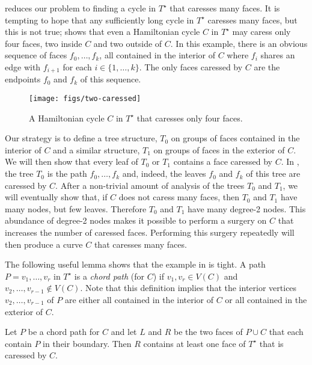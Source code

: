 \documentclass[a4paper,UKenglish]{socg-lipics-v2019}
\newcommand{\dual}[1]{{#1}^\star}
\begin{document}
 reduces our problem to finding a cycle in
$\dual{T}$ that caresses many faces.  It is tempting to hope that
any sufficiently long cycle in $\dual{T}$ caresses many faces, but
this is not true;  shows that even a Hamiltonian
cycle $C$ in $\dual{T}$ may caress only four faces, two inside $C$ and
two outside of $C$.  In this example, there is an obvious sequence of
faces $f_0,\ldots,f_k$, all contained in the interior of $C$ where $f_i$
shares an edge with $f_{i+1}$ for each $i\in\{1,\ldots,k\}$.  The only
faces caressed by $C$ are the endpoints $f_0$ and $f_k$ of this sequence.

\begin{figure}
   \begin{center}
       \texttt{[image: figs/two-caressed]}
   \end{center}
   \caption{A Hamiltonian cycle $C$ in $\dual{T}$ that caresses only four faces.}
\end{figure}

Our strategy is to define a tree structure, $T_0$ on groups of faces
contained in the interior of $C$ and a similar structure, $T_1$ on groups
of faces in the exterior of $C$.  We will then show that every leaf of
$T_0$ or $T_1$ contains a face caressed by $C$. In ,
the tree $T_0$ is the path $f_0,\ldots,f_k$ and, indeed, the leaves $f_0$
and $f_k$ of this tree are caressed by $C$.  After a non-trivial amount
of analysis of the trees $T_0$ and $T_1$, we will eventually show that,
if $C$ does not caress many faces, then $T_0$ and $T_1$ have many nodes,
but few leaves.  Therefore $T_0$ and $T_1$ have many degree-2 nodes.
This abundance of degree-2 nodes makes it possible to perform a surgery
on $C$ that increases the number of caressed faces.  Performing this
surgery repeatedly will then produce a curve $C$ that caresses many faces.

The following useful lemma shows that the example in 
is tight.  A path $P=v_1,\ldots,v_r$ in $\dual{T}$ is a \emph{chord
path} (for $C$) if $v_1,v_r\in V(C)$ and $v_2,\ldots,v_{r-1}\not\in
V(C)$.  Note that this definition implies that the interior vertices
$v_2,\ldots,v_{r-1}$ of $P$ are either all contained in the interior of
$C$ or all contained in the exterior of $C$.

\begin{lem}
   Let $P$ be a chord path for $C$ and let $L$ and $R$ be the two faces
   of $P\cup C$ that each contain $P$ in their boundary. Then $R$
   contains at least one face of $\dual{T}$ that is caressed by $C$.
\end{lem}
\end{document}
